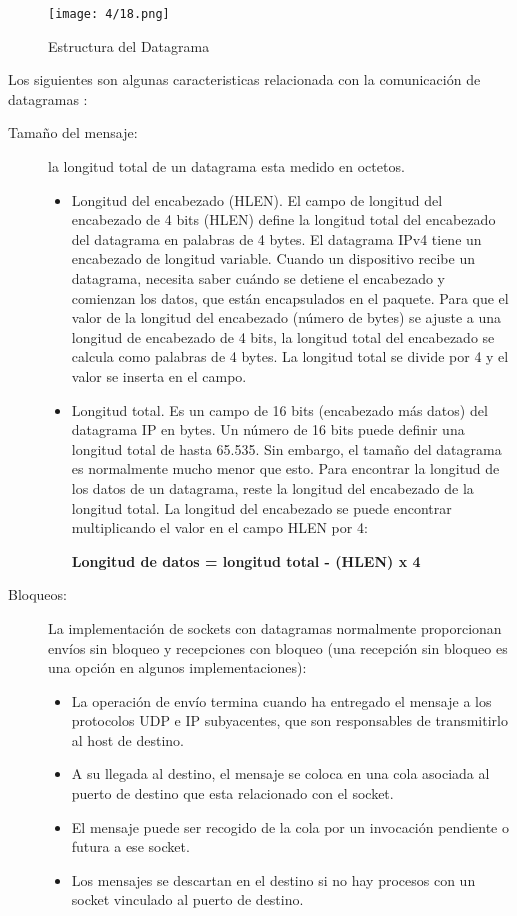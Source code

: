 	\begin{figure}
		\texttt{[image: 4/18.png]}
		\caption{Estructura del Datagrama}
		\label{fig:datagram}
	\end{figure} 


Los siguientes son algunas caracteristicas relacionada  con la comunicación de datagramas :
\begin{description}
	\item [Tamaño del mensaje:] la longitud total de un datagrama esta medido en octetos.
	\begin{itemize}
		\item Longitud del encabezado (HLEN). El campo de longitud del encabezado de 4 bits (HLEN) define la longitud total del encabezado del datagrama en palabras de 4 bytes. El datagrama IPv4 tiene un encabezado de longitud variable. Cuando un dispositivo recibe un datagrama, necesita saber cuándo se detiene el encabezado y comienzan los datos, que están encapsulados en el paquete. Para que el valor de la longitud del encabezado (número de bytes) se ajuste a una longitud de encabezado de 4 bits, la longitud total del encabezado se calcula como palabras de 4 bytes. La longitud total se divide por 4 y el valor se inserta en el campo.
		\item Longitud total. Es un campo de 16 bits  (encabezado más datos) del datagrama IP en bytes. Un número de 16 bits puede definir una longitud total de hasta 65.535. Sin embargo, el tamaño del datagrama es normalmente mucho menor que esto. Para encontrar la longitud de los datos de un datagrama, reste la longitud del encabezado de la longitud total. La longitud del encabezado se puede encontrar multiplicando el valor en el campo HLEN por 4:
		
		\begin{kaobox}
		\small{\textbf{Longitud de datos = longitud total - (HLEN) x 4}}
		\end{kaobox}   
		
	\end{itemize}
	
	\item[Bloqueos:]  La implementación de sockets con datagramas  normalmente proporcionan envíos sin bloqueo y recepciones con bloqueo (una recepción sin bloqueo es una opción en algunos implementaciones): 
	\begin{itemize}
		\item La operación de envío termina cuando ha entregado el mensaje a los protocolos UDP e IP subyacentes, que son responsables de transmitirlo al host de destino. 
		\item A su llegada al destino, el mensaje se coloca en una cola asociada al puerto de destino que esta relacionado con el socket. 
		\item El mensaje puede ser recogido de la cola por un invocación pendiente o futura a ese socket. 
		\item Los mensajes se descartan en 	el destino si no hay  procesos  con un socket vinculado al puerto de destino.
	\end{itemize} 
	

\end{description}
